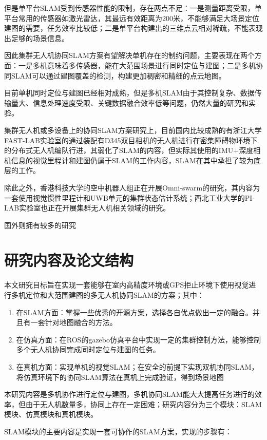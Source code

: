 但是单平台SLAM受到传感器性能的限制，存在两点不足：一是测量距离受限，单平台常用的传感器如激光雷达，其最远有效距离为200米，不能够满足大场景定位建图的需要，任务效率比较低；二是单平台构建出的三维点云相对稀疏，不能表现出足够的场景信息\cite{高家隆2019多无人机协同定位与建图技术研究}。

因此集群无人机协同SLAM方案有望解决单机存在的制约问题，主要表现在两个方面：一是多机意味着多传感器，能在大范围场景进行同时定位与建图；二是多机协同SLAM可以通过建图覆盖的检测，构建更加稠密和精细的点云地图。

目前单机同时定位与建图已经相对成熟，但是多机SLAM由于其控制复杂、数据传输量大、信息处理速度受限、关键数据融合效率低等问题，仍然大量的研究和实验。

集群无人机或多设备上的协同SLAM方案研究上，目前国内比较成熟的有浙江大学FAST-LAB实验室的通过装配有D345双目相机的无人机进行在密集障碍物环境下的分布式无人机编队行进，其弱化了SLAM的内容，但实际其使用的IMU+深度相机信息的视觉里程计和建图仍属于SLAM的工作内容，SLAM在其中承担了较为底层的工作。

除此之外，香港科技大学的空中机器人组正在开展Omni-swarm的研究，其内容为一套使用视觉惯性里程计和UWB单元的集群状态估计系统；西北工业大学的PI-LAB实验室也正在开展集群无人机相关领域的研究。

国外则拥有较多的研究

\section{研究内容及论文结构}
本文研究目标旨在实现一套能够在室内高精度环境或GPS拒止环境下使用视觉进行多机定位和大范围建图的多无人机协同SLAM的方案；其中：

\begin{enumerate}
	\item 在SLAM方面：掌握一些优秀的开源方案，选择各自优点做出一定的融合。并且有一套针对地图融合的方法。
	\item 在仿真方面：在ROS的gazebo仿真平台中实现一定的集群控制方法，能够控制多个无人机协同完成同时定位与建图的任务。
	\item 在真机方面：实现单机的视觉SLAM；在安全的前提下实现双机协同SLAM，将仿真环境下的协同SLAM算法在真机上完成验证，得到场景地图
\end{enumerate}

本研究内容是多机协作进行定位与建图，多机协同SLAM能大大提高任务进行的效率，但由于无人机数量多，协同上存在一定困难；研究内容分为三个模块：SLAM模块、仿真模块和真机模块。

SLAM模块的主要内容是实现一套可协作的SLAM方案，实现的步骤有：

